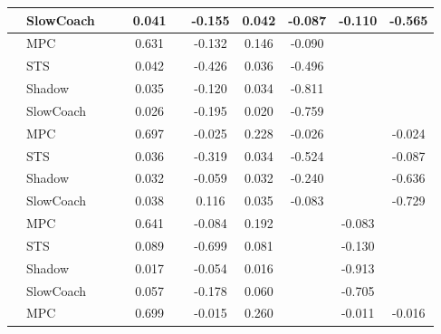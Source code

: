 \begin{tabular}{|l|l|*{9}{c|}}
                                                           & SlowCoach &       &        &     0.041 &     & -0.155 &  0.042 &  -0.087 &  -0.110 &   -0.565 \\
\midrule
[False, False, True, False, True, True, True, False, False] & MPC &       &        &     0.631 &     & -0.132 &  0.146 &  -0.090 &      &       \\
                                                           & STS &       &        &     0.042 &     & -0.426 &  0.036 &  -0.496 &      &       \\
                                                           & Shadow &       &        &     0.035 &     & -0.120 &  0.034 &  -0.811 &      &       \\
                                                           & SlowCoach &       &        &     0.026 &     & -0.195 &  0.020 &  -0.759 &      &       \\
\midrule
[False, False, True, False, True, True, True, False, True] & MPC &       &        &     0.697 &     & -0.025 &  0.228 &  -0.026 &      &   -0.024 \\
                                                           & STS &       &        &     0.036 &     & -0.319 &  0.034 &  -0.524 &      &   -0.087 \\
                                                           & Shadow &       &        &     0.032 &     & -0.059 &  0.032 &  -0.240 &      &   -0.636 \\
                                                           & SlowCoach &       &        &     0.038 &     &  0.116 &  0.035 &  -0.083 &      &   -0.729 \\
\midrule
[False, False, True, False, True, True, False, True, False] & MPC &       &        &     0.641 &     & -0.084 &  0.192 &      &  -0.083 &       \\
                                                           & STS &       &        &     0.089 &     & -0.699 &  0.081 &      &  -0.130 &       \\
                                                           & Shadow &       &        &     0.017 &     & -0.054 &  0.016 &      &  -0.913 &       \\
                                                           & SlowCoach &       &        &     0.057 &     & -0.178 &  0.060 &      &  -0.705 &       \\
\midrule
[False, False, True, False, True, True, False, True, True] & MPC &       &        &     0.699 &     & -0.015 &  0.260 &      &  -0.011 &   -0.016 \\

\end{tabular}
